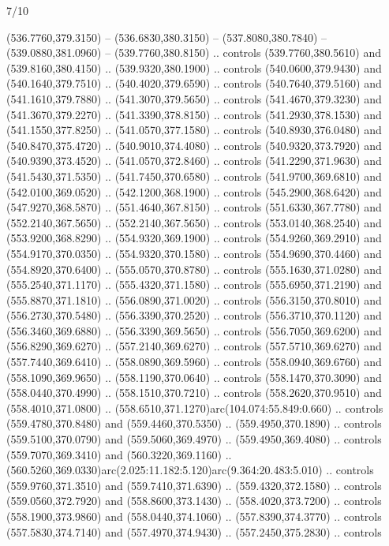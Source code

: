 \begin{flagdescription}{7/10}
\begin{scope}[xshift=0.5\flaglength]
\begin{scope}[scale=0.00185\flagwidth,yshift=245mm,xshift=-43.7mm]
\begin{scope}[y=-0.8pt, x=0.8pt, inner sep=0pt, outer sep=0pt]
\begin{scope}[shift={(-344.0678,183.89831)}]
  (536.7760,379.3150) -- (536.6830,380.3150) -- (537.8080,380.7840) --
  (539.0880,381.0960) -- (539.7760,380.8150) .. controls (539.7760,380.5610) and
  (539.8160,380.4150) .. (539.9320,380.1900) .. controls (540.0600,379.9430) and
  (540.1640,379.7510) .. (540.4020,379.6590) .. controls (540.7640,379.5160) and
  (541.1610,379.7880) .. (541.3070,379.5650) .. controls (541.4670,379.3230) and
  (541.3670,379.2270) .. (541.3390,378.8150) .. controls (541.2930,378.1530) and
  (541.1550,377.8250) .. (541.0570,377.1580) .. controls (540.8930,376.0480) and
  (540.8470,375.4720) .. (540.9010,374.4080) .. controls (540.9320,373.7920) and
  (540.9390,373.4520) .. (541.0570,372.8460) .. controls (541.2290,371.9630) and
  (541.5430,371.5350) .. (541.7450,370.6580) .. controls (541.9700,369.6810) and
  (542.0100,369.0520) .. (542.1200,368.1900) .. controls (545.2900,368.6420) and
  (547.9270,368.5870) .. (551.4640,367.8150) .. controls (551.6330,367.7780) and
  (552.2140,367.5650) .. (552.2140,367.5650) .. controls (553.0140,368.2540) and
  (553.9200,368.8290) .. (554.9320,369.1900) .. controls (554.9260,369.2910) and
  (554.9170,370.0350) .. (554.9320,370.1580) .. controls (554.9690,370.4460) and
  (554.8920,370.6400) .. (555.0570,370.8780) .. controls (555.1630,371.0280) and
  (555.2540,371.1170) .. (555.4320,371.1580) .. controls (555.6950,371.2190) and
  (555.8870,371.1810) .. (556.0890,371.0020) .. controls (556.3150,370.8010) and
  (556.2730,370.5480) .. (556.3390,370.2520) .. controls (556.3710,370.1120) and
  (556.3460,369.6880) .. (556.3390,369.5650) .. controls (556.7050,369.6200) and
  (556.8290,369.6270) .. (557.2140,369.6270) .. controls (557.5710,369.6270) and
  (557.7440,369.6410) .. (558.0890,369.5960) .. controls (558.0940,369.6760) and
  (558.1090,369.9650) .. (558.1190,370.0640) .. controls (558.1470,370.3090) and
  (558.0440,370.4990) .. (558.1510,370.7210) .. controls (558.2620,370.9510) and
  (558.4010,371.0800) .. (558.6510,371.1270)arc(104.074:55.849:0.660) ..
  controls (559.4780,370.8480) and (559.4460,370.5350) .. (559.4950,370.1890) ..
  controls (559.5100,370.0790) and (559.5060,369.4970) .. (559.4950,369.4080) ..
  controls (559.7070,369.3410) and (560.3220,369.1160) ..
  (560.5260,369.0330)arc(2.025:11.182:5.120)arc(9.364:20.483:5.010) .. controls
  (559.9760,371.3510) and (559.7410,371.6390) .. (559.4320,372.1580) .. controls
  (559.0560,372.7920) and (558.8600,373.1430) .. (558.4020,373.7200) .. controls
  (558.1900,373.9860) and (558.0440,374.1060) .. (557.8390,374.3770) .. controls
  (557.5830,374.7140) and (557.4970,374.9430) .. (557.2450,375.2830) .. controls

\end{scope}
\end{scope}
\end{scope}
\end{scope}
\end{flagdescription}
